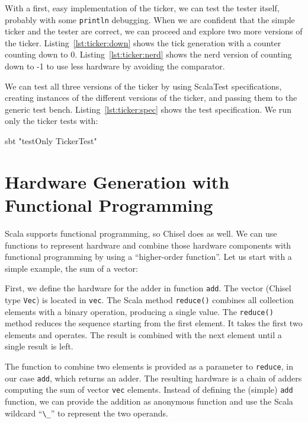 \documentclass[%
    10pt,
    headinclude, footinclude=false,
    openright, %
    notitlepage,
    cleardoublepage=empty,
    headsepline,
    numbers=noenddot,
    bibliography=totoc, index=totoc,
    ]{scrbook}
\newcommand{\code}[1]{{\lstinline[basicstyle=\small\ttfamily]{#1}}}
\begin{document}
With a first, easy implementation of the ticker, we can test the tester
itself, probably with some \code{println} debugging. When we are confident that
the simple ticker and the tester are correct, we can proceed and explore
two more versions of the ticker. Listing~\ref{lst:ticker:down} shows the tick
generation with a counter counting down to 0.
Listing~\ref{lst:ticker:nerd} shows the nerd version of counting down to -1 to use
less hardware by avoiding the comparator.



We can test all three versions of the ticker by using ScalaTest specifications,
creating instances of the different versions of the ticker, and passing them
to the generic test bench. Listing~\ref{lst:ticker:spec} shows the test specification.
We run only the ticker tests with:
\begin{chisel}
sbt "testOnly TickerTest"
\end{chisel}


\section{Hardware Generation with Functional Programming}
\label{sec:functional}


Scala supports functional programming, so Chisel does as well.
We can use functions to represent hardware and combine those hardware components
with functional programming by using a ``higher-order function''.
Let us start with a simple example, the sum of a vector:


First, we define the hardware for the adder in function \code{add}.
The vector (Chisel type \code{Vec}) is located in \code{vec}. The Scala method \code{reduce()} combines
all collection elements with a binary operation, producing a single value.
The \code{reduce()} method reduces the sequence starting from the first element.
It takes the first two elements and operates. The result is combined
with the next element until a single result is left.

The function to combine two elements is provided as a parameter to \code{reduce}, in our case \code{add},
which returns an adder. The resulting hardware is a chain of adders computing
the sum of vector \code{vec} elements.
Instead of defining the (simple) \code{add} function, we can provide the addition
as anonymous function and use the Scala wildcard ``\code{\_}'' to represent the
two operands.
\end{document}
